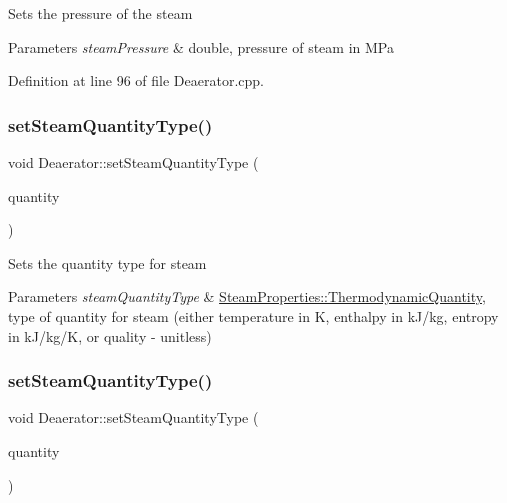 Sets the pressure of the steam 
\begin{DoxyParams}{Parameters}
{\em steam\+Pressure} & double, pressure of steam in M\+Pa \\
\hline
\end{DoxyParams}


Definition at line 96 of file Deaerator.\+cpp.

\mbox{\label{class_deaerator_a1aa3b3de064d148479af9576e717b6c2}} 
\subsubsection{\texorpdfstring{set\+Steam\+Quantity\+Type()}{setSteamQuantityType()}\hspace{0.1cm}{\footnotesize\ttfamily [1/3]}}
{\footnotesize\ttfamily void Deaerator\+::set\+Steam\+Quantity\+Type (\begin{DoxyParamCaption}\item[{\hyperlink{class_steam_properties_ae0294bedf7d178c2d8fb6aed0f62fbff}{Steam\+Properties\+::\+Thermodynamic\+Quantity}}]{quantity }\end{DoxyParamCaption})}

Sets the quantity type for steam 
\begin{DoxyParams}{Parameters}
{\em steam\+Quantity\+Type} & \hyperlink{class_steam_properties_ae0294bedf7d178c2d8fb6aed0f62fbff}{Steam\+Properties\+::\+Thermodynamic\+Quantity}, type of quantity for steam (either temperature in K, enthalpy in k\+J/kg, entropy in k\+J/kg/K, or quality -\/ unitless) \\
\hline
\end{DoxyParams}
\mbox{\label{class_deaerator_a1aa3b3de064d148479af9576e717b6c2}} 
\subsubsection{\texorpdfstring{set\+Steam\+Quantity\+Type()}{setSteamQuantityType()}\hspace{0.1cm}{\footnotesize\ttfamily [2/3]}}
{\footnotesize\ttfamily void Deaerator\+::set\+Steam\+Quantity\+Type (\begin{DoxyParamCaption}\item[{\hyperlink{class_steam_properties_ae0294bedf7d178c2d8fb6aed0f62fbff}{Steam\+Properties\+::\+Thermodynamic\+Quantity}}]{quantity }\end{DoxyParamCaption})}

